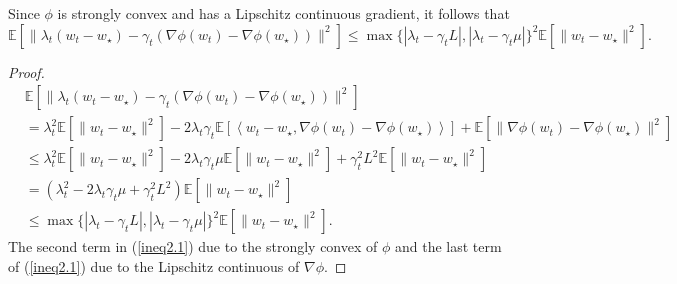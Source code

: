 \begin{lemma}
	Since $\phi$ is strongly convex and has a Lipschitz continuous gradient, it follows that
	\begin{equation}
		\mathbb{E}\left[ \|\lambda_t(w_t-w_\star)-\gamma_t(\nabla\phi(w_t)-\nabla\phi(w_\star))\|^2\right]
		\leq
		\max\{ |\lambda_t-\gamma_t L|,|\lambda_t-\gamma_t \mu|  \}^2\mathbb{E}\left[\|w_t-w_\star\|^2 \right].
	\end{equation}
\end{lemma}
\begin{proof}
	\begin{align}
		&\mathbb{E}\left[ \|\lambda_t(w_t-w_\star)-\gamma_t(\nabla\phi(w_t)-\nabla\phi(w_\star))\|^2\right]\\
		&=\lambda_t^2\mathbb{E}\left[\|w_t-w_\star\|^2 \right] -2\lambda_t\gamma_t\mathbb{E}\left[ \left<w_t-w_\star, \nabla\phi(w_t)-\nabla\phi(w_\star) \right>\right]
		+\mathbb{E}\left[\|\nabla\phi(w_t)-\nabla\phi(w_\star)\|^2 \right]\\
		\label{ineq2.1}
		&\leq \lambda_t^2 \mathbb{E}\left[\|w_t-w_\star\|^2 \right]
		-2\lambda_t \gamma_t \mu\mathbb{E}\left[\|w_t-w_\star\|^2 \right]
		+\gamma_t^2 L^2 \mathbb{E}\left[\|w_t-w_\star\|^2 \right]\\
		&=(\lambda_t^2-2\lambda_t\gamma_t\mu+\gamma_t^2 L^2)\mathbb{E}\left[\|w_t-w_\star\|^2 \right]\\
		&\leq \max\{ |\lambda_t-\gamma_t L|,|\lambda_t-\gamma_t \mu|  \}^2
		\mathbb{E}\left[\|w_t-w_\star\|^2 \right].
	\end{align}
	The second term in (\ref{ineq2.1}) due to the strongly convex of $\phi$ and the last term of (\ref{ineq2.1}) due to the Lipschitz continuous of $\nabla\phi$.
\end{proof}

